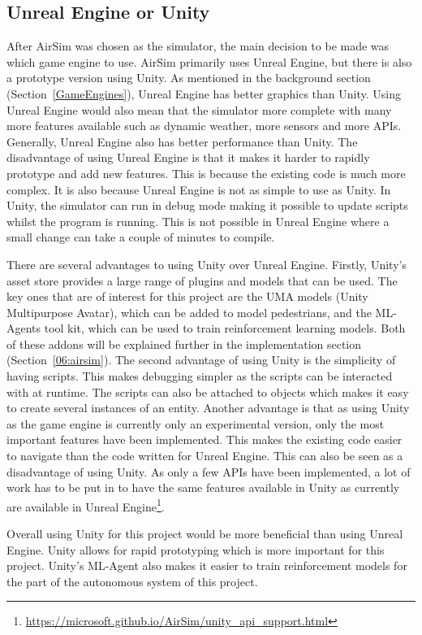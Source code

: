 \subsection{Unreal Engine or Unity} \label{05:AD:UEvUnity}
After AirSim was chosen as the simulator, the main decision to be made was which game engine to use. AirSim primarily uses Unreal Engine, but there is also a prototype version using Unity. As mentioned in the background section (Section~\ref{GameEngines}), Unreal Engine has better graphics than Unity. Using Unreal Engine would also mean that the simulator more complete with many more features available such as dynamic weather, more sensors and more APIs. Generally, Unreal Engine also has better performance than Unity\cite{vsmid2017comparison}. The disadvantage of using Unreal Engine is that it makes it harder to rapidly prototype and add new features. This is because the existing code is much more complex. It is also because Unreal Engine is not as simple to use as Unity. In Unity, the simulator can run in debug mode making it possible to update scripts whilst the program is running. This is not possible in Unreal Engine where a small change can take a couple of minutes to compile. 

There are several advantages to using Unity over Unreal Engine. Firstly, Unity's asset store provides a large range of plugins and models that can be used. The key ones that are of interest for this project are the UMA models (Unity Multipurpose Avatar), which can be added to model pedestrians, and the ML-Agents tool kit, which can be used to train reinforcement learning models. Both of these addons will be explained further in the implementation section (Section~\ref{06:airsim}). The second advantage of using Unity is the simplicity of having scripts. This makes debugging simpler as the scripts can be interacted with at runtime. The scripts can also be attached to objects which makes it easy to create several instances of an entity. Another advantage is that as using Unity as the game engine is currently only an experimental version, only the most important features have been implemented. This makes the existing code easier to navigate than the code written for Unreal Engine. This can also be seen as a disadvantage of using Unity. As only a few APIs have been implemented, a lot of work has to be put in to have the same features available in Unity as currently are available in Unreal Engine\footnote{\url{https://microsoft.github.io/AirSim/unity_api_support.html}}. 

Overall using Unity for this project would be more beneficial than using Unreal Engine. Unity allows for rapid prototyping which is more important for this project. Unity's ML-Agent also makes it easier to train reinforcement models for the part of the autonomous system of this project. 

